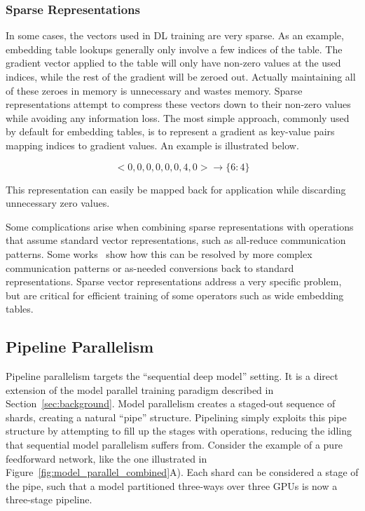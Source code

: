 \subsubsection{Sparse Representations}
In some cases, the vectors used in DL training are very sparse. As an example, embedding table lookups generally only involve a few indices of the table. The gradient vector applied to the table will only have non-zero values at the used indices, while the rest of the gradient will be zeroed out. Actually maintaining all of these zeroes in memory is unnecessary and wastes memory. Sparse representations attempt to compress these vectors down to their non-zero values while avoiding any information loss. The most simple approach, commonly used by default for embedding tables, is to represent a gradient as key-value pairs mapping indices to gradient values. An example is illustrated below.

\[ <0, 0, 0, 0, 0, 0, 4, 0> \rightarrow \{6: 4\} \]

This representation can easily be mapped back for application while discarding unnecessary zero values.

Some complications arise when combining sparse representations with operations that assume standard vector representations, such as all-reduce communication patterns. Some works~\cite{mlplatformmeetup2022} show how this can be resolved by more complex communication patterns or as-needed conversions back to standard representations. Sparse vector representations address a very specific problem, but are critical for efficient training of some operators such as wide embedding tables.

\subsection{Pipeline Parallelism} 
Pipeline parallelism targets the ``sequential deep model'' setting. It is a direct extension of the model parallel training paradigm described in Section~\ref{sec:background}. Model parallelism creates a staged-out sequence of shards, creating a natural ``pipe'' structure. Pipelining simply exploits this pipe structure by attempting to fill up the stages with operations, reducing the idling that sequential model parallelism suffers from. Consider the example of a pure feedforward network, like the one illustrated in Figure~\ref{fig:model_parallel_combined}A). Each shard can be considered a stage of the pipe, such that a model partitioned three-ways over three GPUs is now a three-stage pipeline.

